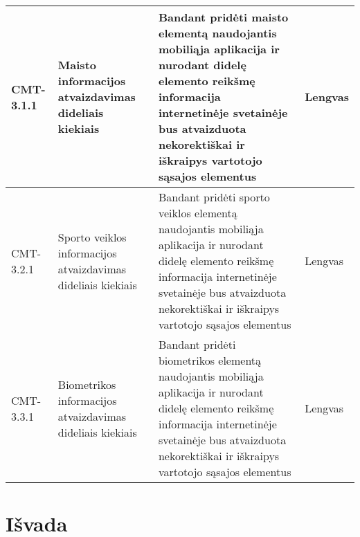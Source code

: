 \documentclass[oneside]{VUMIFPSkursinis}
\begin{document}
\begin{center}
    \begin{tabular}{ |p{1cm}| p{7cm} | p{7cm} | p{2cm} |}
    \hline
    CMT-3.1.1 & Maisto informacijos atvaizdavimas dideliais kiekiais & Bandant pridėti maisto elementą naudojantis mobiliąja aplikacija ir nurodant didelę elemento reikšmę informacija internetinėje svetainėje bus atvaizduota nekorektiškai ir iškraipys vartotojo sąsajos elementus & Lengvas \\ \hline
    CMT-3.2.1 & Sporto veiklos informacijos atvaizdavimas dideliais kiekiais & Bandant pridėti sporto veiklos elementą naudojantis mobiliąja aplikacija ir nurodant didelę elemento reikšmę informacija internetinėje svetainėje bus atvaizduota nekorektiškai ir iškraipys vartotojo sąsajos elementus & Lengvas \\ \hline
    CMT-3.3.1 & Biometrikos informacijos atvaizdavimas dideliais kiekiais & Bandant pridėti biometrikos elementą naudojantis mobiliąja aplikacija ir nurodant didelę elemento reikšmę informacija internetinėje svetainėje bus atvaizduota nekorektiškai ir iškraipys vartotojo sąsajos elementus & Lengvas \\ \hline   
   \hline
    \end{tabular}
\end{center}

\section{Išvada}

	
\end{document}

